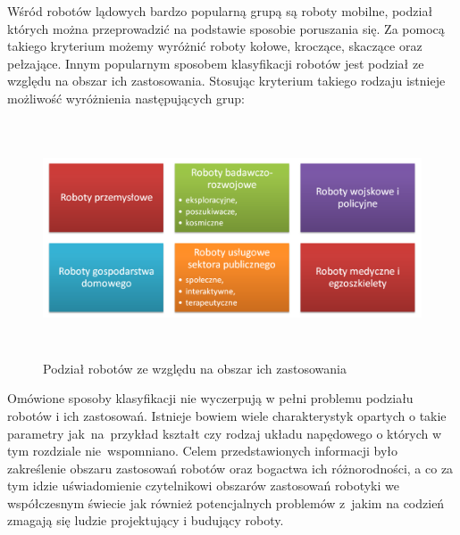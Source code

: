 Wśród robotów lądowych bardzo popularną grupą są roboty mobilne, podział których
można przeprowadzić na podstawie sposobie poruszania się. Za pomocą takiego
kryterium możemy wyróżnić roboty kołowe, kroczące, skaczące oraz pełzające.
Innym popularnym sposobem klasyfikacji robotów jest podział ze względu na 
obszar ich zastosowania. Stosując kryterium takiego rodzaju istnieje możliwość
wyróżnienia następujących grup:
\begin{figure}[hb]
 \centering
 \includegraphics[height=70mm]{../images/ch01/robot_types.png}
 \caption{Podział robotów ze względu na obszar ich zastosowania}
 \label{fig:RobotsDiv}
\end{figure}

Omówione sposoby klasyfikacji nie wyczerpują w pełni problemu podziału
robotów i ich zastosowań. Istnieje bowiem wiele charakterystyk opartych o takie
parametry jak~na~przykład kształt czy rodzaj układu napędowego o których w tym
rozdziale nie~wspomniano. Celem przedstawionych informacji było zakreślenie
obszaru zastosowań robotów oraz bogactwa ich różnorodności, a co za tym idzie
uświadomienie czytelnikowi obszarów zastosowań robotyki we współczesnym świecie
jak również potencjalnych problemów z~jakim na codzień zmagają się ludzie
projektujący i budujący roboty.